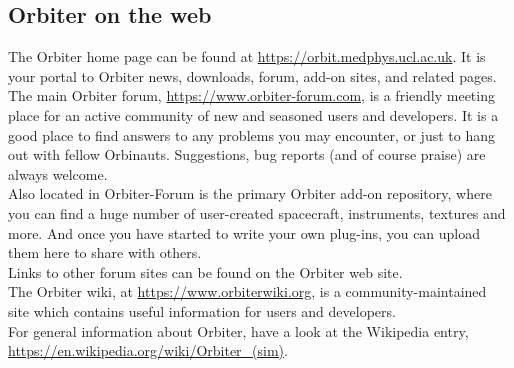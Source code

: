\documentclass[Orbiter User Manual.tex]{subfiles}
\begin{document}
\subsection{Orbiter on the web}
The Orbiter home page can be found at \url{https://orbit.medphys.ucl.ac.uk}. It is your portal to Orbiter news, downloads, forum, add-on sites, and related pages.\\
The main Orbiter forum, \url{https://www.orbiter-forum.com}, is a friendly meeting place for an active community of new and seasoned users and developers. It is a good place to find answers to any problems you may encounter, or just to hang out with fellow Orbinauts. Suggestions, bug reports (and of course praise) are always welcome.\\
Also located in Orbiter-Forum is the primary Orbiter add-on repository, where you can find a huge number of user-created spacecraft, instruments, textures and more. And once you have started to write your own plug-ins, you can upload them here to share with others.\\
Links to other forum sites can be found on the Orbiter web site.\\
The Orbiter wiki, at \url{https://www.orbiterwiki.org}, is a community-maintained site which contains useful information for users and developers.\\
For general information about Orbiter, have a look at the Wikipedia entry, \url{https://en.wikipedia.org/wiki/Orbiter_(sim)}.
\end{document}
